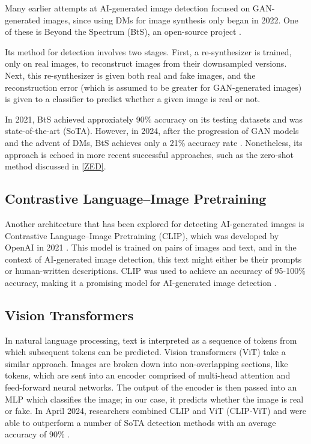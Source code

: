 \documentclass{article} %
\begin{document}
Many earlier attempts at AI-generated image detection focused on GAN-generated images, since using DMs for image synthesis only began in 2022. One of these is Beyond the Spectrum (BtS), an open-source project \citep{he2021spectrumdetectingdeepfakesresynthesis}.

Its method for detection involves two stages. First, a re-synthesizer is trained, only on real images, to reconstruct images from their downsampled versions. Next, this re-synthesizer is given both real and fake images, and the reconstruction error (which is assumed to be greater for GAN-generated images) is given to a classifier to predict whether a given image is real or not.

In 2021, BtS achieved approxiately 90\% accuracy on its testing datasets and was state-of-the-art (SoTA). However, in 2024, after the progression of GAN models and the advent of DMs, BtS achieves only a 21\% accuracy rate \citep{li2024adversarialaiartunderstandinggeneration}. Nonetheless, its approach is echoed in more recent successful approaches, such as the zero-shot method discussed in \ref{ZED}.

\subsection{Contrastive Language–Image Pretraining}

Another architecture that has been explored for detecting AI-generated images is Contrastive Language–Image Pretraining (CLIP), which was developed by OpenAI in 2021 \citep{radford2021learningtransferablevisualmodels}. This model is trained on pairs of images and text, and in the context of AI-generated image detection, this text might either be their prompts or human-written descriptions. CLIP was used to achieve an accuracy of 95-100\% accuracy, making it a promising model for AI-generated image detection \citep{moskowitz2024detectingaigeneratedimagesclip}.

\subsection{Vision Transformers}

In natural language processing, text is interpreted as a sequence of tokens from which subsequent tokens can be predicted. Vision transformers (ViT) take a similar approach. Images are broken down into non-overlapping sections, like tokens, which are sent into an encoder comprised of multi-head attention and feed-forward neural networks. The output of the encoder is then passed into an MLP which classifies the image; in our case, it predicts whether the image is real or fake. In April 2024, researchers combined CLIP and ViT (CLIP-ViT) and were able to outperform a number of SoTA detection methods with an average accuracy of 90\% \citep{cozzolino2024raisingbaraigeneratedimage}.
\end{document}

